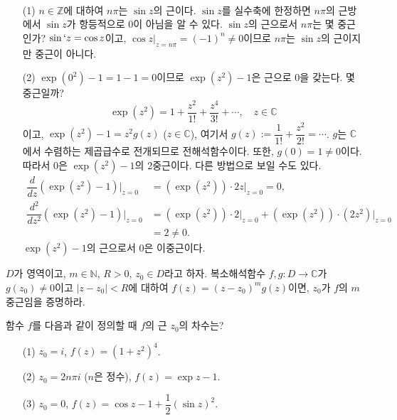 \begin{saltexample}{}{} \label{example-4-6}
\
\begin{itemize}
\item[(1)] $n\in \mathbb Z$에 대하여 $n\pi$는 $\sin z$의 근이다.
$\sin z$를 실수축에 한정하면 $n\pi$의 근방에서 
$\sin z$가 항등적으로 $0$이 아님을 알 수 있다.
$\sin z$의 근으로서 $n\pi$는 몇 중근인가?
$\sin `z = \cos z$이고, $\cos z \Big|_{z=n\pi}= (-1)^n \ne 0$이므로
$n\pi$는 $\sin z$의 근이지만 중근이 아니다.
\item[(2)] $\exp(0^2) -1 = 1-1 = 0$이므로
$\exp (z^2) -1$은 근으로 $0$을 갖는다.
몇 중근일까?
\[
\exp (z^2) = 1 + \dfrac{z^2}{1!} + \dfrac{z^4}{3!} + \cdots,
\quad z\in \mathbb C
\]
이고, $\exp(z^2) -1 = z^2g(z)$ ($z\in \mathbb C$),
여기서 $g(z):= \dfrac1{1!} + \dfrac{z^2}{2!} = \cdots$.
$g$는 $\mathbb C$에서 수렴하는  제곱급수로 전개되므로
전해석함수이다. 또한, $g(0)=1\ne 0$이다.
따라서 $0$은 $\exp(z^2) -1$의 2중근이다.
다른 방법으로 보일 수도 있다.
\begin{align*}
\dfrac{d}{dz} (\exp(z^2)-1) \Big|_{z=0} 
&= (\exp(z^2))\cdot 2z  \Big|_{z=0}  = 0, \\
\dfrac{d^2}{dz^2} (\exp(z^2)-1)\Big|_{z=0} 
&=  (\exp(z^2))\cdot 2 \Big|_{z=0}  +  (\exp(z^2))\cdot (2z^2)  \Big|_{z=0}  \\
&= 2\ne 0.
\end{align*}
$\exp(z^2) -1$의 근으로서 $0$은 이중근이다.
\end{itemize}
\end{saltexample}

\begin{salt_exercise} \label{ex-4-17}
$D$가 영역이고, $m\in \mathbb N$, $R>0$, $z_0\in D$라고 하자.
복소해석함수 $f,g: D\to \mathbb C$가 $g(z_0)\ne0$이고
$|z-z_0|<R$에 대하여 $f(z) = (z-z_0)^m g(z)$이면,
$z_0$가 $f$의 $m$ 중근임을 증명하라.
\end{salt_exercise}

\begin{salt_exercise} \label{ex-4-18}
함수 $f$를 다음과 같이 정의할 때 $f$의 근 $z_0$의 차수는?
\begin{itemize}
\item[(1)]  $z_0 = i$, $f(z) = (1+z^2)^4$.
\item[(2)]  $z_0 = 2n\pi i$ ($n$은 정수), $f(z) = \exp z -1$.
\item[(3)] $z_0=0$, $f(z) = \cos z - 1 + \dfrac12(\sin z)^2$.
\end{itemize}
\end{salt_exercise}

